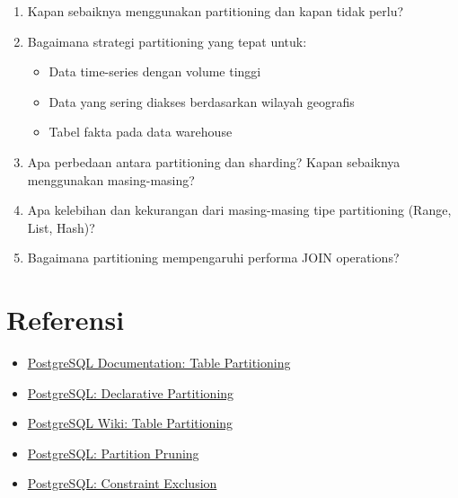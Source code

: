 \begin{enumerate}
    \item Kapan sebaiknya menggunakan partitioning dan kapan tidak perlu?
    
    \item Bagaimana strategi partitioning yang tepat untuk:
    \begin{itemize}
        \item Data time-series dengan volume tinggi
        \item Data yang sering diakses berdasarkan wilayah geografis
        \item Tabel fakta pada data warehouse
    \end{itemize}
    
    \item Apa perbedaan antara partitioning dan sharding? Kapan sebaiknya menggunakan masing-masing?
    
    \item Apa kelebihan dan kekurangan dari masing-masing tipe partitioning (Range, List, Hash)?
    
    \item Bagaimana partitioning mempengaruhi performa JOIN operations?
\end{enumerate}

\section{Referensi}

\begin{itemize}
    \item \href{https://www.postgresql.org/docs/current/ddl-partitioning.html}{PostgreSQL Documentation: Table Partitioning}
    \item \href{https://www.postgresql.org/docs/current/ddl-partitioning.html#DDL-PARTITIONING-DECLARATIVE}{PostgreSQL: Declarative Partitioning}
    \item \href{https://wiki.postgresql.org/wiki/Table_partitioning}{PostgreSQL Wiki: Table Partitioning}
    \item \href{https://www.postgresql.org/docs/current/ddl-partitioning.html#DDL-PARTITIONING-IMPLEMENTATION}{PostgreSQL: Partition Pruning}
    \item \href{https://www.postgresql.org/docs/current/ddl-partitioning.html#DDL-PARTITIONING-CONSTRAINT-EXCLUSION}{PostgreSQL: Constraint Exclusion}
\end{itemize}